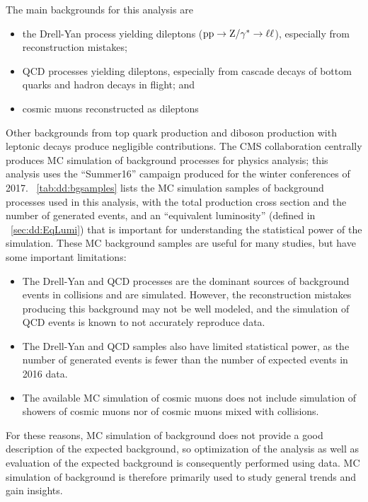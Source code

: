 The main backgrounds for this analysis are
\begin{itemize}
  \item the Drell-Yan process yielding dileptons ($\mathrm{p}\mathrm{p}\to\mathrm{Z}/\gamma^* \to \ell\ell$), especially from reconstruction mistakes;
  \item QCD processes yielding dileptons, especially from cascade decays of bottom quarks and hadron decays in flight; and
  \item cosmic muons reconstructed as dileptons
\end{itemize}
Other backgrounds from top quark production and diboson production with leptonic decays produce negligible contributions.
The CMS collaboration centrally produces MC simulation of background processes for physics analysis; this analysis uses the ``Summer16'' campaign produced for the winter conferences of 2017.
\Tab~\ref{tab:dd:bgsamples} lists the MC simulation samples of background processes used in this analysis, with the total production cross section and the number of generated events, and an ``equivalent luminosity'' (defined in \Sec~\ref{sec:dd:EqLumi}) that is important for understanding the statistical power of the simulation.
These MC background samples are useful for many studies, but have some important limitations:
\begin{itemize}
  \item The Drell-Yan and QCD processes are the dominant sources of background events in \pp collisions and are simulated. However, the reconstruction mistakes producing this background may not be well modeled, and the simulation of QCD events is known to not accurately reproduce data.
  \item The Drell-Yan and QCD samples also have limited statistical power, as the number of generated events is fewer than the number of expected events in 2016 data.
  \item The available MC simulation of cosmic muons does not include simulation of showers of cosmic muons nor of cosmic muons mixed with \pp collisions.
\end{itemize}
For these reasons, MC simulation of background does not provide a good description of the expected background, so optimization of the analysis as well as evaluation of the expected background is consequently performed using data.
MC simulation of background is therefore primarily used to study general trends and gain insights.

